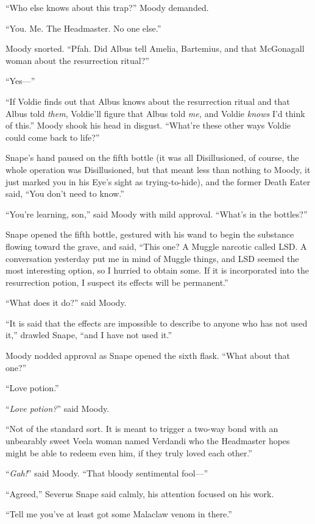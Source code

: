 “Who else knows about this trap?” Moody demanded.

“You. Me. The Headmaster. No one else.”

Moody snorted. “Pfah. Did Albus tell Amelia, Bartemius, and that McGonagall woman about the resurrection ritual?”

“Yes—”

“If Voldie finds out that Albus knows about the resurrection ritual and that Albus told \emph{them}, Voldie’ll figure that Albus told \emph{me,} and Voldie \emph{knows} I’d think of this.” Moody shook his head in disgust. “What’re these other ways Voldie could come back to life?”

Snape’s hand paused on the fifth bottle (it was all Disillusioned, of course, the whole operation was Disillusioned, but that meant less than nothing to Moody, it just marked you in his Eye’s sight as trying-to-hide), and the former Death Eater said, “You don’t need to know.”

“You’re learning, son,” said Moody with mild approval. “What’s in the bottles?”

Snape opened the fifth bottle, gestured with his wand to begin the substance flowing toward the grave, and said, “This one? A Muggle narcotic called LSD. A conversation yesterday put me in mind of Muggle things, and LSD seemed the most interesting option, so I hurried to obtain some. If it is incorporated into the resurrection potion, I suspect its effects will be permanent.”

“What does it do?” said Moody.

“It is said that the effects are impossible to describe to anyone who has not used it,” drawled Snape, “and I have not used it.”

Moody nodded approval as Snape opened the sixth flask. “What about that one?”

“Love potion.”

“\emph{Love potion?}” said Moody.

“Not of the standard sort. It is meant to trigger a two-way bond with an unbearably sweet Veela woman named Verdandi who the Headmaster hopes might be able to redeem even him, if they truly loved each other.”

“\emph{Gah!}” said Moody. “That bloody sentimental fool—”

“Agreed,” Severus Snape said calmly, his attention focused on his work.

“Tell me you’ve at least got some Malaclaw venom in there.”

